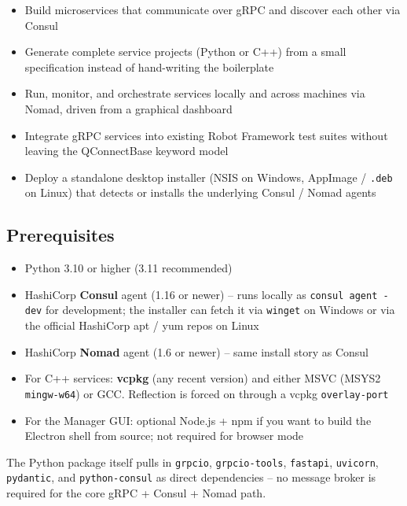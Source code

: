 \begin{itemize}
   \item Build microservices that communicate over gRPC and discover each other via Consul
   \item Generate complete service projects (Python or C++) from a small specification
         instead of hand-writing the boilerplate
   \item Run, monitor, and orchestrate services locally and across machines via Nomad,
         driven from a graphical dashboard
   \item Integrate gRPC services into existing Robot Framework test suites without
         leaving the QConnectBase keyword model
   \item Deploy a standalone desktop installer (NSIS on Windows, AppImage / \texttt{.deb}
         on Linux) that detects or installs the underlying Consul / Nomad agents
\end{itemize}

\subsection{Prerequisites}

\begin{itemize}
   \item Python 3.10 or higher (3.11 recommended)
   \item HashiCorp \textbf{Consul} agent (1.16 or newer) -- runs locally as
         \texttt{consul agent -dev} for development; the installer can fetch it via
         \texttt{winget} on Windows or via the official HashiCorp apt / yum repos on Linux
   \item HashiCorp \textbf{Nomad} agent (1.6 or newer) -- same install story as Consul
   \item For C++ services: \textbf{vcpkg} (any recent version) and either MSVC
         (MSYS2 \texttt{mingw-w64}) or GCC.  Reflection is forced on through a vcpkg
         \texttt{overlay-port}
   \item For the Manager GUI: optional Node.js + npm if you want to build the Electron
         shell from source; not required for browser mode
\end{itemize}

\noindent
The Python package itself pulls in \texttt{grpcio}, \texttt{grpcio-tools}, \texttt{fastapi},
\texttt{uvicorn}, \texttt{pydantic}, and \texttt{python-consul} as direct dependencies --
no message broker is required for the core gRPC + Consul + Nomad path.

